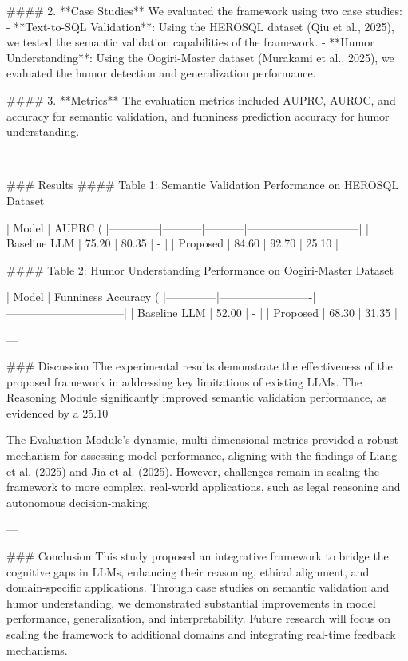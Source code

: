 #### 2. **Case Studies**  
We evaluated the framework using two case studies:  
- **Text-to-SQL Validation**: Using the HEROSQL dataset (Qiu et al., 2025), we tested the semantic validation capabilities of the framework.  
- **Humor Understanding**: Using the Oogiri-Master dataset (Murakami et al., 2025), we evaluated the humor detection and generalization performance.  

#### 3. **Metrics**  
The evaluation metrics included AUPRC, AUROC, and accuracy for semantic validation, and funniness prediction accuracy for humor understanding.  

---

### Results  
#### Table 1: Semantic Validation Performance on HEROSQL Dataset  

| Model        | AUPRC (%
|--------------|-----------|-----------|------------------------------|  
| Baseline LLM | 75.20     | 80.35     | -                            |  
| Proposed     | 84.60     | 92.70     | 25.10                        |  

#### Table 2: Humor Understanding Performance on Oogiri-Master Dataset  

| Model        | Funniness Accuracy (%
|--------------|-------------------------|--------------------------------|  
| Baseline LLM | 52.00                  | -                              |  
| Proposed     | 68.30                  | 31.35                          |  

---

### Discussion  
The experimental results demonstrate the effectiveness of the proposed framework in addressing key limitations of existing LLMs. The Reasoning Module significantly improved semantic validation performance, as evidenced by a 25.10%

The Evaluation Module's dynamic, multi-dimensional metrics provided a robust mechanism for assessing model performance, aligning with the findings of Liang et al. (2025) and Jia et al. (2025). However, challenges remain in scaling the framework to more complex, real-world applications, such as legal reasoning and autonomous decision-making.  

---

### Conclusion  
This study proposed an integrative framework to bridge the cognitive gaps in LLMs, enhancing their reasoning, ethical alignment, and domain-specific applications. Through case studies on semantic validation and humor understanding, we demonstrated substantial improvements in model performance, generalization, and interpretability. Future research will focus on scaling the framework to additional domains and integrating real-time feedback mechanisms.  

